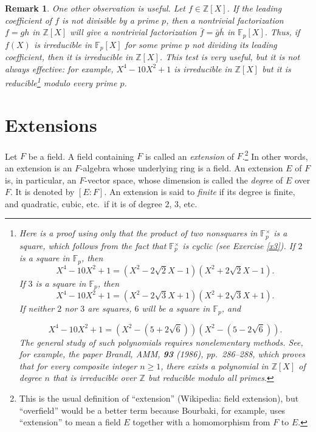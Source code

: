 \documentclass[a4paper,11pt,final,openany]{memoir}
\newtheorem{remark}[X]{Remark}
\theoremstyle{nonumberplain}
\begin{document}
\begin{remark}
\label{ef8m}One other observation is useful. Let $f\in\mathbb{Z}[X]$. If the
leading coefficient of $f$ is not divisible by a prime $p$, then a nontrivial
factorization $f=gh$ in $\mathbb{Z}{}[X]$ will give a nontrivial factorization
$\bar{f}=\bar{g}\bar{h}$ in $\mathbb{F}{}_{p}[X]$. Thus, if $f(X)$ is
irreducible in $\mathbb{F}_{p}[X]$ for some prime $p$ not dividing its leading
coefficient, then it is irreducible in $\mathbb{Z}{}[X]$. This test is very
useful, but it is not always effective: for example, $X^{4}-10X^{2}+1$ is
irreducible in $\mathbb{Z}{}[X]$ but it is reducible\footnote{Here is a proof
using only that the product of two nonsquares in $\mathbb{F}{}_{p}^{\times}$
is a square, which follows from the fact that $\mathbb{F}{}_{p}^{\times}$ is
cyclic (see Exercise \ref{x3}). If $2$ is a square in $\mathbb{F}{}_{p}$, then%
\[
X^{4}-10X^{2}+1=(X^{2}-2\sqrt{2}X-1)(X^{2}+2\sqrt{2}X-1).
\]
If $3$ is a square in $\mathbb{F}{}_{p}$, then%
\[
X^{4}-10X^{2}+1=(X^{2}-2\sqrt{3}X+1)(X^{2}+2\sqrt{3}X+1).
\]
If neither $2$ nor $3$ are squares, $6$ will be a square in $\mathbb{F}{}_{p}%
$, and
\par%
\[
X^{4}-10X^{2}+1=(X^{2}-(5+2\sqrt{6}))(X^{2}-(5-2\sqrt{6})).
\]
The general study of such polynomials requires nonelementary methods. See, for
example, the paper Brandl, AMM, \textbf{93} (1986), pp.\ 286--288, which
proves that for every composite integer $n\geq1$, there exists a polynomial in
$\mathbb{Z}{}[X]$ of degree $n$ that is irreducible over $\mathbb{Z}$ but
reducible modulo all primes$.$} modulo every prime $p$.
\end{remark}

\section{Extensions}

Let $F$ be a field. A field containing $F$ is called an
%
\emph{extension} of $F$.\footnote{This is the usual definition of
``extension'' (Wikipedia: field extension), but ``overfield'' would be a
better term because Bourbaki, for example, uses ``extension'' to mean a field
$E$ together with a homomorphism from $F$ to $E$.} In other words, an
extension is an $F$-algebra whose underlying ring is a field. An extension $E$
of $F$ is, in particular, an $F$-vector space, whose dimension is called the
\emph{degree\/}%
of $E$ over $F$. It is denoted by $[E\colon F]$. An extension is said to
\emph{finite }%
if its degree is finite, and quadratic, cubic, etc.\ if it is of degree $2$,
$3$, etc.
\end{document}
